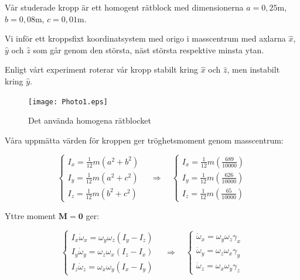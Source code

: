 \documentclass[12pt,a4paper]{article}
\begin{document}
		Vår studerade kropp är ett homogent rätblock med dimensionerna
		$a = 0,25 \mathrm{m}$, $b = 0,08 \mathrm{m}$, $c = 0,01 \mathrm{m}$.
		
		Vi inför ett kroppsfixt koordinatsystem med origo i masscentrum med axlarna
		$\hat{x}$, $\hat{y}$ och $\hat{z}$ som går genom den största, näst
		största respektive minsta ytan.
		
		Enligt vårt experiment roterar vår kropp stabilt kring $\hat{x}$ och $\hat{z}$, men
		instabilt kring $\hat{y}$.
		
		\begin{figure}
			\begin{center}
				\texttt{[image: Photo1.eps]}
				\caption{Det använda homogena rätblocket}
			\end{center}
		\end{figure}
		
		Våra uppmätta värden för kroppen ger tröghetsmoment genom masscentrum:
		
		\begin{equation*}
			\begin{cases}
				I_x = \frac{1}{12} m (a^2 + b^2) \\
				I_y = \frac{1}{12} m (a^2 + c^2) \\
				I_z = \frac{1}{12} m (b^2 + c^2) 
			\end{cases}
			\hspace{12pt}
			\Rightarrow
			\hspace{12pt}
			\begin{cases}
				I_x = \frac{1}{12} m (\frac{689}{10000}) \\
				I_y = \frac{1}{12} m (\frac{626}{10000}) \\
				I_z = \frac{1}{12} m (\frac{65}{10000})
			\end{cases}
		\end{equation*}
		
		Yttre moment $\mathbf{M}=\mathbf{0}$ ger:
		
		\begin{equation*}
			\begin{cases}
				I_x \dot{\omega}_x = \omega_y \omega_z (I_y - I_z) \\
				I_y \dot{\omega}_y = \omega_z \omega_x (I_z - I_x) \\
				I_z \dot{\omega}_z = \omega_x \omega_y (I_x - I_y)
			\end{cases}
			\hspace{12pt}
			\Rightarrow
			\hspace{12pt}
			\begin{cases}
				\dot{\omega}_x = \omega_y \omega_z \gamma_x \\
				\dot{\omega}_y = \omega_z \omega_x \gamma_y \\
				\dot{\omega}_z = \omega_x \omega_y \gamma_z
			\end{cases}
		\end{equation*}
		
\end{document}

